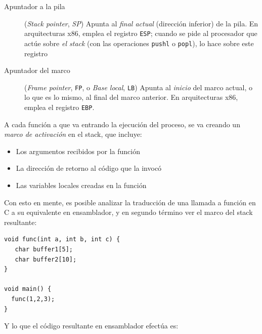 \documentclass[11pt,fleqn]{book} %
\begin{document}
\begin{description}
\item[Apuntador a la pila] (\emph{Stack pointer}, \emph{SP}) Apunta al \emph{final      actual} (dirección inferior) de la pila. En arquitecturas x86,
     emplea el registro \texttt{ESP}; cuando se pide al procesador que actúe sobre
     \emph{el stack} (con las operaciones \texttt{pushl} o \texttt{popl}), lo hace sobre
     este registro
\item[Apuntador del marco] (\emph{Frame pointer}, \texttt{FP}, o \emph{Base local}, \texttt{LB})
     Apunta al \emph{inicio} del marco actual, o lo que es lo mismo, al
     final del marco anterior. En arquitecturas x86, emplea el
     registro \texttt{EBP}.
\end{description}

A cada función a que va entrando la ejecución del proceso, se va
creando un \emph{marco de activación} en el stack, que incluye:

\begin{itemize}
\item Los argumentos recibidos por la función
\item La dirección de retorno al código que la invocó
\item Las variables locales creadas en la función
\end{itemize}

Con esto en mente, es posible  analizar la traducción
de una llamada a función en C a su equivalente en ensamblador, y en
segundo término ver el marco del stack resultante:


\begin{verbatim}
void func(int a, int b, int c) {
   char buffer1[5];
   char buffer2[10];
}

void main() {
  func(1,2,3);
}
\end{verbatim}

Y lo que el código resultante en ensamblador efectúa es:
\end{document}
